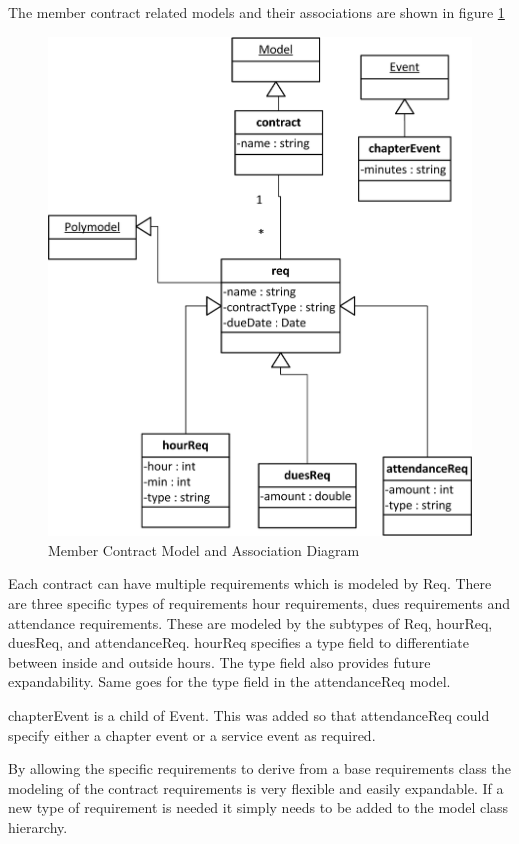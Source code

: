 \documentclass{article}
\begin{document}
The member contract related models and their associations are shown in figure \ref{fig:memberContractModelDiagram}

\FloatBarrier
\begin{figure}[h!]
\centering
\includegraphics[scale=.65]{img/modelDiagrams/contractModel}
\caption{Member Contract Model and Association Diagram}
\label{fig:memberContractModelDiagram}
\end{figure}
\FloatBarrier

Each contract can have multiple requirements which is modeled by Req. There are three specific types of requirements hour requirements, dues requirements and attendance requirements. These are modeled by the subtypes of Req, hourReq, duesReq, and attendanceReq. hourReq specifies a type field to differentiate between inside and outside hours. The type field also provides future expandability. Same goes for the type field in the attendanceReq model.

chapterEvent is a child of Event. This was added so that attendanceReq could specify either a chapter event or a service event as required.

By allowing the specific requirements to derive from a base requirements class the modeling of the contract requirements is very flexible and easily expandable. If a new type of requirement is needed it simply needs to be added to the model class hierarchy.
\end{document}

